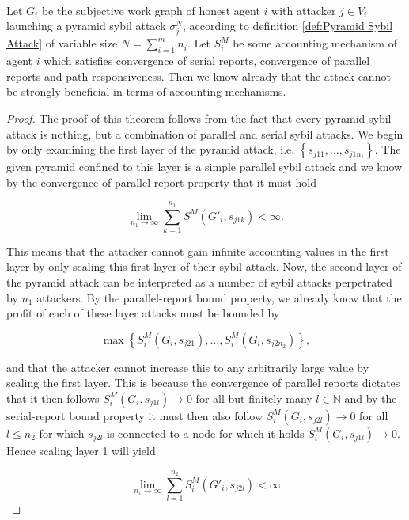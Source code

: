 \begin{proposition}[]\ \\
\label{prop:Sybil-proofness Against Pyramid Attack}
\noindent{}Let $G_i$ be the subjective work graph of honest agent $i$ with attacker $j\in{}V_i$ launching a pyramid sybil attack $\sigma_j^N$, according to definition \ref{def:Pyramid Sybil Attack} of variable size $N=\sum\limits_{i=1}^{m}n_i$. Let $S_i^M$ be some accounting mechanism of agent $i$ which satisfies convergence of serial reports, convergence of parallel reports and path-responsiveness. Then we know already that the attack cannot be strongly beneficial in terms of accounting mechanisms.
\end{proposition}
\begin{proof}
\noindent{}The proof of this theorem follows from the fact that every pyramid sybil attack is nothing, but a combination of parallel and serial sybil attacks. We begin by only examining the first layer of the pyramid attack, i.e. $\left\lbrace{}s_{j11},\ldots,s_{j1n_1}\right\rbrace$. The given pyramid confined to this layer is a simple parallel sybil attack and we know by the convergence of parallel report property that it must hold 

\[
\lim\limits_{n_1\rightarrow\infty}\sum\limits_{k=1}^{n_1}S^M(G'_i,s_{j1k})<\infty.
\]

\noindent{}This means that the attacker cannot gain infinite accounting values in the first layer by only scaling this first layer of their sybil attack. Now, the second layer of the pyramid attack can be interpreted as a number of sybil attacks perpetrated by $n_1$ attackers. By the parallel-report bound property, we already know that the profit of each of these layer attacks must be bounded by

\[
\max\left\lbrace{}S^M_i(G_i,s_{j21}),\ldots,S^M_i(G_i,s_{j2n_2})\right\rbrace{},
\]   

\noindent{}and that the attacker cannot increase this to any arbitrarily large value by scaling the first layer. This is because the convergence of parallel reports dictates that it then follows $S^M_i(G_i,s_{j1l})\rightarrow{}0$ for all but finitely many $l\in\mathbb{N}$ and by the serial-report bound property it must then also follow $S^M_i(G_i,s_{j2l})\rightarrow{}0$ for all $l\leq{}n_2$ for which $s_{j2l}$ is connected to a node for which it holds $S^M_i(G_i,s_{j1l})\rightarrow{}0$. Hence scaling layer 1 will yield

\[
\lim\limits_{n_1\rightarrow\infty}\sum\limits_{l=1}^{n_2}S^M_i(G'_i,s_{j2l})<\infty
\]


\end{proof}

